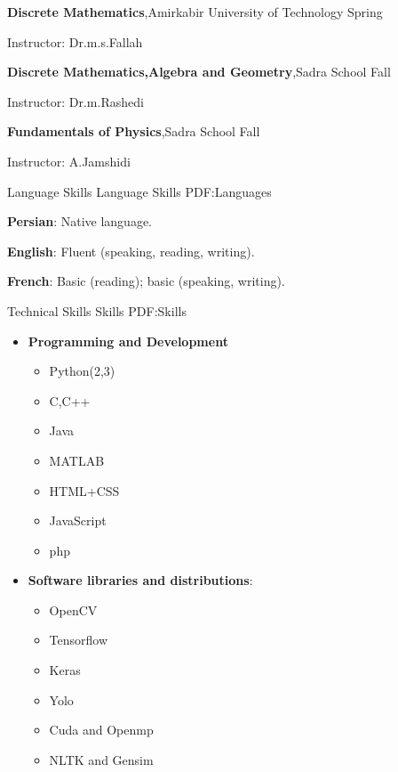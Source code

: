 \documentclass[letterpaper,MMMyyyy,nonstopmode]{simpleresumecv}
\begin{document}
\begin{Body}
\Entry
\textbf{Discrete Mathematics},Amirkabir University of Technology
\hfill
Spring 

\BulletItem
Instructor: Dr.m.s.Fallah


\Entry
\textbf{Discrete Mathematics,Algebra and Geometry},Sadra School
\hfill
Fall 

\BulletItem
Instructor: Dr.m.Rashedi



\Entry
\textbf{Fundamentals of Physics},Sadra School
\hfill
Fall 

\BulletItem
Instructor: A.Jamshidi









\Section
{Language Skills}
{Language Skills}
{PDF:Languages}

\BulletItem
\textbf{Persian}: Native language.

\Gap
\BulletItem
\textbf {English}: Fluent (speaking, reading, writing).

\Gap
\BulletItem
\textbf{French}: Basic (reading); basic (speaking, writing).


\Section
{Technical Skills}
{Skills}
{PDF:Skills}

\Entry

\begin{itemize}
\item \textbf {Programming and Development}
\begin{itemize}
    \item Python(2,3)
    \item C,C++
    \item Java
    \item MATLAB
    \item HTML+CSS
    \item JavaScript
    \item php
    
\end{itemize}



    \item \textbf{ Software libraries and distributions}: 
    \begin{itemize}
        \item OpenCV
        \item Tensorflow
        \item Keras
        \item Yolo
        \item Cuda and Openmp
        \item NLTK and Gensim
    \end{itemize}
     



\end{itemize}
\end{Body}
\end{document}
